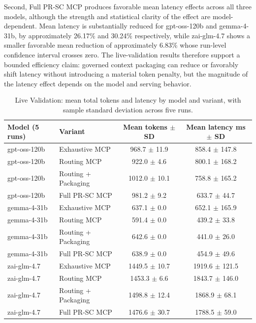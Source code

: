 Second, Full PR-SC MCP produces favorable mean latency effects across all three models, although the strength and statistical clarity of the effect are model-dependent. Mean latency is substantially reduced for gpt-oss-120b and gemma-4-31b, by approximately 26.17\% and 30.24\% respectively, while zai-glm-4.7 shows a smaller favorable mean reduction of approximately 6.83\% whose run-level confidence interval crosses zero. The live-validation results therefore support a bounded efficiency claim: governed context packaging can reduce or favorably shift latency without introducing a material token penalty, but the magnitude of the latency effect depends on the model and serving behavior.

\begin{table}[!t]
  \caption{Live Validation: mean total tokens and latency by model and variant, with sample standard deviation across five runs.}
  \label{tab:efficiency}
  \begin{tabular}{llcc}
    \toprule
    \textbf{Model (5 runs)} & \textbf{Variant} & \textbf{Mean tokens $\pm$ SD} & \textbf{Mean latency ms $\pm$ SD} \\
    \midrule
    gpt-oss-120b & Exhaustive MCP & 968.7 $\pm$ 11.9 & 858.4 $\pm$ 147.8 \\
    gpt-oss-120b & Routing MCP & 922.0 $\pm$ 4.6 & 800.1 $\pm$ 168.2 \\
    gpt-oss-120b & Routing + Packaging & 1012.0 $\pm$ 10.1 & 758.8 $\pm$ 165.2 \\
    gpt-oss-120b & Full PR-SC MCP & 981.2 $\pm$ 9.2 & 633.7 $\pm$ 44.7 \\
    gemma-4-31b & Exhaustive MCP & 637.1 $\pm$ 0.0 & 652.1 $\pm$ 165.9 \\
    gemma-4-31b & Routing MCP & 591.4 $\pm$ 0.0 & 439.2 $\pm$ 33.8 \\
    gemma-4-31b & Routing + Packaging & 642.6 $\pm$ 0.0 & 441.0 $\pm$ 26.0 \\
    gemma-4-31b & Full PR-SC MCP & 638.9 $\pm$ 0.0 & 454.9 $\pm$ 49.6 \\
    zai-glm-4.7 & Exhaustive MCP & 1449.5 $\pm$ 10.7 & 1919.6 $\pm$ 121.5 \\
    zai-glm-4.7 & Routing MCP & 1453.3 $\pm$ 6.6 & 1843.7 $\pm$ 146.0 \\
    zai-glm-4.7 & Routing + Packaging & 1498.8 $\pm$ 12.4 & 1868.9 $\pm$ 68.1 \\
    zai-glm-4.7 & Full PR-SC MCP & 1476.6 $\pm$ 30.7 & 1788.5 $\pm$ 59.0 \\
    \bottomrule
  \end{tabular}


\end{table}
